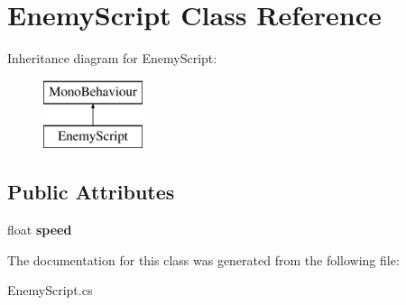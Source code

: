 \hypertarget{class_enemy_script}{}\section{Enemy\+Script Class Reference}
\label{class_enemy_script}
Inheritance diagram for Enemy\+Script\+:\begin{figure}[H]
\begin{center}
\leavevmode
\includegraphics[height=2.000000cm]{class_enemy_script}
\end{center}
\end{figure}
\subsection*{Public Attributes}
\begin{DoxyCompactItemize}
\item 
\hypertarget{class_enemy_script_a2c618fda4a3b98cd7fc1089c682c3e90}{}\label{class_enemy_script_a2c618fda4a3b98cd7fc1089c682c3e90} 
float {\bfseries speed}
\end{DoxyCompactItemize}


The documentation for this class was generated from the following file\+:\begin{DoxyCompactItemize}
\item 
Enemy\+Script.\+cs\end{DoxyCompactItemize}
